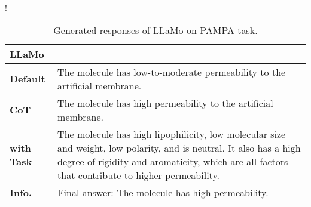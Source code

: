 
\begin{table}[ht!]
\begin{resizebox}{\linewidth}{!}{
\centering
\renewcommand{\arraystretch}{1.1}
\begin{tabular}{p{1.2cm} p{18cm}}
\toprule
\multicolumn{2}{l}{\large \textbf{LLaMo}}  \\
\midrule

\textbf{Default} & The molecule has low-to-moderate permeability to the artificial membrane. \\


\midrule


\textbf{CoT} & The molecule has high permeability to the artificial membrane. \\

\midrule


\textbf{with Task} & The molecule has high lipophilicity, low molecular size and weight, low polarity, and is neutral. It also has a high degree of rigidity and aromaticity, which are all factors that contribute to higher permeability. \\
\textbf{Info.} & Final answer: The molecule has high permeability. \\
\bottomrule
\end{tabular}}
\end{resizebox}
\vspace{-0.1in}
\caption{Generated responses of LLaMo on PAMPA task.}
\label{app:tab:pampa_LLaMo}
\end{table}
